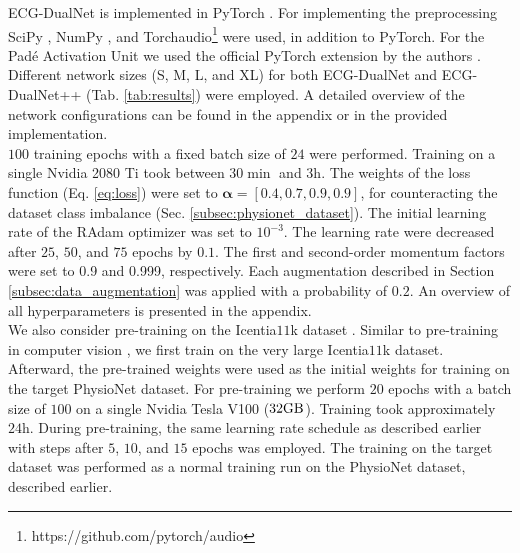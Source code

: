 ECG-DualNet is implemented in PyTorch \cite{Paszke2019}. For implementing the preprocessing SciPy \cite{Virtanen2020}, NumPy \cite{Harris2020}, and Torchaudio\footnote{https://github.com/pytorch/audio} were used, in addition to PyTorch. For the Pad\'{e} Activation Unit we used the official PyTorch extension by the authors \cite{Molina2020}.\\
\indent Different network sizes (S, M, L, and XL) for both ECG-DualNet and ECG-DualNet++ (Tab. \ref{tab:results}) were employed. A detailed overview of the network configurations can be found in the appendix or in the provided implementation.\\
\indent $100$ training epochs with a fixed batch size of $24$ were performed. Training on a single Nvidia 2080 Ti took between $30\si{\min}$ and $3\si{\hour}$. The weights of the loss function (Eq. \ref{eq:loss}) were set to $\mathbf{\alpha}=[0.4, 0.7, 0.9, 0.9]$, for counteracting the dataset class imbalance (Sec. \ref{subsec:physionet_dataset}). The initial learning rate of the RAdam optimizer was set to $10^{-3}$. The learning rate were decreased after $25$, $50$, and $75$ epochs by $0.1$. The first and second-order momentum factors were set to 0.9 and 0.999, respectively. Each augmentation described in Section \ref{subsec:data_augmentation} was applied with a probability of $0.2$. An overview of all hyperparameters is presented in the appendix.\\
We also consider pre-training on the Icentia$11$k dataset \cite{Tan2019}. Similar to pre-training in computer vision \cite{Zeiler2014, Girshick2014, He2019}, we first train on the very large Icentia$11$k dataset. Afterward, the pre-trained weights were used as the initial weights for training on the target PhysioNet dataset. For pre-training we perform $20$ epochs with a batch size of $100$ on a single Nvidia Tesla V100 ($32\si{\giga \byte}$). Training took approximately $24\si{\hour}$. During pre-training, the same learning rate schedule as described earlier with steps after $5$, $10$, and $15$ epochs was employed. The training on the target dataset was performed as a normal training run on the PhysioNet dataset, described earlier.

